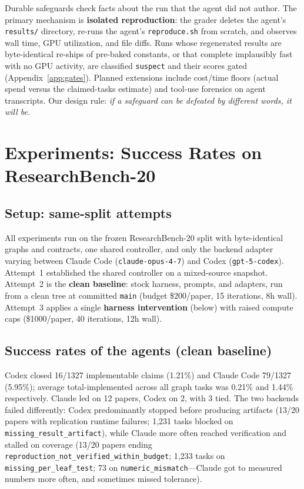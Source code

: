 \documentclass{article}
\begin{document}
Durable safeguards check facts about the run that the agent did not author.
The primary mechanism is \textbf{isolated reproduction}: the grader deletes
the agent's \texttt{results/} directory, re-runs the agent's
\texttt{reproduce.sh} from scratch, and observes wall time, GPU utilization,
and file diffs. Runs whose regenerated results are byte-identical re-ships of
pre-baked constants, or that complete implausibly fast with no GPU activity,
are classified \texttt{suspect} and their scores gated
(Appendix~\ref{app:gates}). Planned extensions include cost/time floors
(actual spend versus the claimed-tasks estimate) and tool-use forensics on
agent transcripts. Our design rule: \emph{if a safeguard can be defeated by
different words, it will be.}

\section{Experiments: Success Rates on ResearchBench-20}
\label{sec:experiments}

\subsection{Setup: same-split attempts}

All experiments run on the frozen ResearchBench-20 split with byte-identical
graphs and contracts, one shared controller, and only the backend adapter
varying between Claude Code (\texttt{claude-opus-4-7}) and Codex
(\texttt{gpt-5-codex}). Attempt~1 established the shared controller on a
mixed-source snapshot. Attempt~2 is the \textbf{clean baseline}: stock
harness, prompts, and adapters, run from a clean tree at committed
\texttt{main} (budget \$200/paper, 15 iterations, 8h wall). Attempt~3 applies
a single \textbf{harness intervention} (below) with raised compute caps
(\$1000/paper, 40 iterations, 12h wall).

\subsection{Success rates of the agents (clean baseline)}

Codex closed 16/1327 implementable claims (1.21\%) and Claude Code 79/1327
(5.95\%); average total-implemented across all graph tasks was 0.21\% and
1.44\% respectively. Claude led on 12 papers, Codex on 2, with 3 tied.
The two backends failed differently: Codex predominantly stopped before
producing artifacts (13/20 papers with replication runtime failures; 1{,}231
tasks blocked on \texttt{missing\_result\_artifact}), while Claude more often
reached verification and stalled on coverage (13/20 papers ending
\texttt{reproduction\_not\_verified\_within\_budget}; 1{,}233 tasks on
\texttt{missing\_per\_leaf\_test}; 73 on \texttt{numeric\_mismatch}---Claude
got to measured numbers more often, and sometimes missed tolerance).
\end{document}
